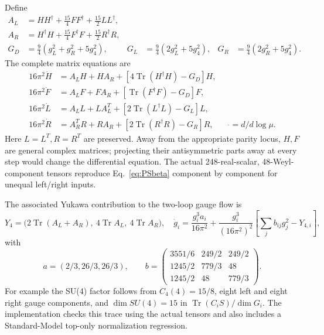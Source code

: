 \documentclass[11pt]{article}
\newcommand{\tr}{\operatorname{Tr}}
\begin{document}
Define
\begin{align}
A_L&=HH^\dagger+\tfrac{15}{4}FF^\dagger+\tfrac{15}{2}LL^\dagger,\\
A_R&=H^\dagger H+\tfrac{15}{4}F^\dagger F+\tfrac{15}{2}R^\dagger R,\\
G_D&=\tfrac94(g_L^2+g_R^2+5g_4^2),&
G_L&=\tfrac94(2g_L^2+5g_4^2),&G_R&=\tfrac94(2g_R^2+5g_4^2).
\end{align}
The complete matrix equations are
\begin{align}
16\pi^2\dot H&=A_LH+HA_R+[4\tr(H^\dagger H)-G_D]H,\\
16\pi^2\dot F&=A_LF+FA_R+[\tr(F^\dagger F)-G_D]F,\\
16\pi^2\dot L&=A_LL+LA_L^T+[2\tr(L^\dagger L)-G_L]L,\\
16\pi^2\dot R&=A_R^TR+RA_R+[2\tr(R^\dagger R)-G_R]R,
\qquad\dot{}=d/d\log\mu.
\label{eq:PSbeta}
\end{align}
Here $L=L^T,R=R^T$ are preserved. Away from the appropriate parity locus,
$H,F$ are general complex matrices; projecting their antisymmetric parts
away at every step would change the differential equation.
The actual 248-real-scalar, 48-Weyl-component tensors reproduce
Eq.~\eqref{eq:PSbeta} component by component for unequal left/right inputs.

The associated Yukawa contribution to the two-loop gauge flow is
\begin{equation}
Y_4=\big(2\tr(A_L+A_R),\ 4\tr A_L,\ 4\tr A_R\big),
\quad
\dot g_i=\frac{g_i^3a_i}{16\pi^2}
+\frac{g_i^3}{(16\pi^2)^2}\left[\sum_jb_{ij}g_j^2-Y_{4,i}\right],
\end{equation}
with
\begin{equation}
a=(2/3,26/3,26/3),\qquad
b=\begin{pmatrix}3551/6&249/2&249/2\\
1245/2&779/3&48\\1245/2&48&779/3\end{pmatrix}.
\end{equation}
For example the SU(4) factor follows from $C_4(4)=15/8$, eight left and
eight right gauge components, and $\dim SU(4)=15$ in
$\tr(C_iS)/\dim G_i$. The implementation checks this trace using the
actual tensors and also includes a Standard-Model top-only normalization
regression.
\end{document}
